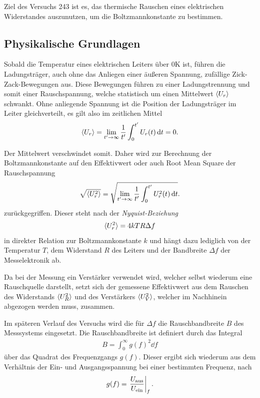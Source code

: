 Ziel des Versuchs 243 ist es, das thermische Rauschen eines elektrischen Widerstandes auszunutzen, um die Boltzmannkonstante zu bestimmen.

\subsection{Physikalische Grundlagen}

Sobald die Temperatur eines elektrischen Leiters über $0$K ist, führen die Ladungsträger, auch ohne das Anliegen einer äußeren Spannung, zufällige Zick-Zack-Bewegungen aus. Diese Bewegungen führen zu einer Ladungstrennung und somit einer Rauschspannung, welche statistisch um einen Mittelwert $\langle U_r \rangle$ schwankt. Ohne anliegende Spannung ist die Position der Ladungsträger im Leiter gleichverteilt, es gilt also im zeitlichen Mittel
\begin{align}
  \langle U_r \rangle = \lim_{t' \to \infty} \frac{1}{t'} \int_0^{t'} U_r(t) \dd{t} = 0.
\end{align}

Der Mittelwert verschwindet somit. Daher wird zur Berechnung der Boltzmannkonstante auf den Effektivwert oder auch Root Mean Square der Rauschspannung
\begin{align}
  \sqrt{\langle U_r^2 \rangle} = \sqrt{\lim_{t' \to \infty} \frac{1}{t'} \int_0^{t'} U_r^2(t) \dd{t}}.
\end{align}
zurückgegriffen. Dieser steht nach der \textit{Nyquist-Beziehung} 
\begin{align}
  \langle U_r^2 \rangle = 4kTR\Delta f
\end{align}
in direkter Relation zur Boltzmannkonstante $k$ und hängt dazu lediglich von der Temperatur $T$, dem Widerstand $R$ des Leiters und der Bandbreite $\Delta f$ der Messelektronik ab.

Da bei der Messung ein Verstärker verwendet wird, welcher selbst wiederum eine Rauschquelle darstellt, setzt sich der gemessene Effektivwert aus dem Rauschen des Widerstands $\langle U_R^2 \rangle$ und des Verstärkers $\langle U_V^2 \rangle$, welcher im Nachhinein abgezogen werden muss, zusammen.

Im späteren Verlauf des Versuchs wird die für $\Delta f$ die Rauschbandbreite $B$ des Messsystems eingesetzt. Die Rauschbandbreite ist definiert durch das Integral 
\begin{align}
  B = \int_0^{\infty} g(f)^2 \dd{f}
\end{align}
über das Quadrat des Frequenzgangs $g(f)$. Dieser ergibt sich wiederum aus dem Verhältnis der Ein- und Ausgangsspannung bei einer bestimmten Frequenz, nach
\begin{align}
  g(f) = \eval{\frac{U_{\text{aus}}}{U_{\text{ein}}}}_f.
\end{align}


